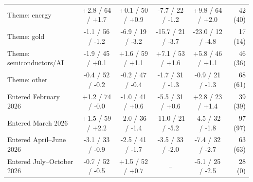 \begin{tabular}{lccccr}
Theme: energy & +2.8 / 64 / +1.7 & +0.1 / 50 / +0.9 & -7.7 / 22 / -1.2 & +9.8 / 64 / +2.0 & 42 (40) \\
Theme: gold & -1.1 / 56 / -1.2 & -6.9 / 19 / -3.2 & -15.7 / 21 / -3.7 & -23.0 / 12 / -4.8 & 17 (14) \\
Theme: semiconductors/AI & -1.9 / 45 / +0.1 & +1.6 / 59 / +1.1 & +7.1 / 53 / +1.6 & +5.8 / 46 / +1.1 & 46 (36) \\
Theme: other & -0.4 / 52 / -0.2 & -0.2 / 47 / -0.4 & -1.7 / 31 / -1.3 & -0.9 / 21 / -1.3 & 68 (61) \\
Entered February 2026 & +1.2 / 74 / -0.0 & -1.0 / 41 / +0.6 & -5.5 / 31 / +0.6 & +2.8 / 23 / +1.4 & 39 (39) \\
Entered March 2026 & +1.5 / 59 / +2.2 & -2.0 / 36 / -1.4 & -11.0 / 21 / -5.2 & -4.5 / 32 / -1.8 & 97 (97) \\
Entered April--June 2026 & -3.1 / 33 / -0.9 & -2.5 / 41 / -1.7 & -3.5 / 33 / -2.0 & -7.4 / 32 / -2.7 & 63 (63) \\
Entered July--October 2026 & -0.7 / 52 / -0.5 & +1.5 / 52 / +0.7 & -- & -5.1 / 25 / -2.5 & 28 (0) \\
\bottomrule
\end{tabular}

